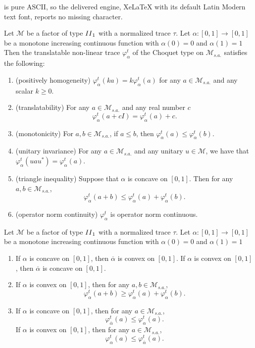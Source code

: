 \documentclass[10pt,a4paper]{amsart}
\newcommand{\M}{\mathcal{M}}
\begin{document}
is pure ASCII, so the delivered engine, XeLaTeX with its default Latin Modern text font, reports no missing character.
\begin{proposition} 
\label{prop:tranlatable}
Let $\M$ be a factor of type ${\rm II}_1$ with a normalized trace $\tau$.  
Let $\alpha: [0,1]  \rightarrow [0, 1]$ be a 
monotone increasing continuous function with $\alpha(0) = 0$ and $\alpha(1) = 1$ 
Then the translatable non-linear trace $\varphi_{\alpha}^{t}$ of the Choquet type on $\M_{s.a.}$ satisfies the following:
\begin{enumerate}
\item[(1)] {\rm (positively homogeneity)} $\varphi_{\alpha}^{t}(ka) = k \varphi_{\alpha}^{t}(a)$ for any 
$a \in  {\M}_{s.a.}$ and any scalar $k \geq 0$. \\
\item[(2)] {\rm (translatability)}  For any $a \in  {\M}_{s.a.}$ and any real number $c$ 
$$
\varphi_{\alpha}^{t}(a + cI) = \varphi_{\alpha}^{t}(a) + c.
$$
\item[(3)] {\rm (monotonicity)} For $a, b \in {\M}_{s.a.}$, if $a \leq b$, then $\varphi_{\alpha}^{t}(a) \leq 
\varphi_{\alpha}^{t}(b). $\\
\item[(4)] {\rm (unitary invariance)} For any $a \in  \M_{s.a.}$ and any unitary $u \in \M$, we have that 
$\varphi_{\alpha}^{t}(uau^*) =  \varphi_{\alpha}^{t}(a)$. \\
\item[(5)] {\rm (triangle inequality)} Suppose that $\alpha$ is concave on $[0,1]$. Then 
for any $a, b \in {\M}_{s.a.}$, 
$$
 \varphi_{\alpha}^{t}(a + b) \leq  \varphi_{\alpha}^{t}(a) + \varphi_{\alpha}^{t}(b).
$$

\item[(6)] {\rm (operator norm continuity)} $\varphi_{\alpha}^{t}$ is operator norm continuous. 
\end{enumerate}
\end{proposition}

\begin{proposition} \label{superadditivity}
Let $\M$ be a factor of type ${\rm II}_1$ with a normalized trace $\tau$.  
Let $\alpha: [0,1]  \rightarrow [0, 1]$ be a 
monotone increasing continuous function with $\alpha(0) = 0$ and $\alpha(1) = 1$ 
\begin{enumerate}
\item[$(1)$] 
If $\alpha$ is concave on $[0,1]$, then $\overline{\alpha}$ is convex on $[0,1]$. 
If $\alpha$ is convex on $[0,1]$, then $\overline{\alpha}$ is concave on $[0,1]$. 
\item[$(2)$] 
If $\alpha$ is convex on $[0,1]$, then for any $a, b \in {\M}_{s.a.}$, 
\[  
\varphi_{\alpha}^{t}(a + b) \geq \varphi_{\alpha}^{t}(a) + \varphi_{\alpha}^{t}(b).
 \]
\item[$(3)$] 
If $\alpha$ is concave on $[0,1]$, then  for any $a \in {\M}_{s.a.}$,
\[ 
\varphi_{\overline{\alpha}}^{t}(a)  \leq \varphi_{\alpha}^{t}(a).
\]
If $\alpha$ is convex on $[0,1]$, then  for any $a \in {\M}_{s.a.}$,
\[
\varphi_{\alpha}^{t}(a) \leq \varphi_{\overline{\alpha}}^{t}(a). 
\]
\end{enumerate}
\end{proposition}
\end{document}
